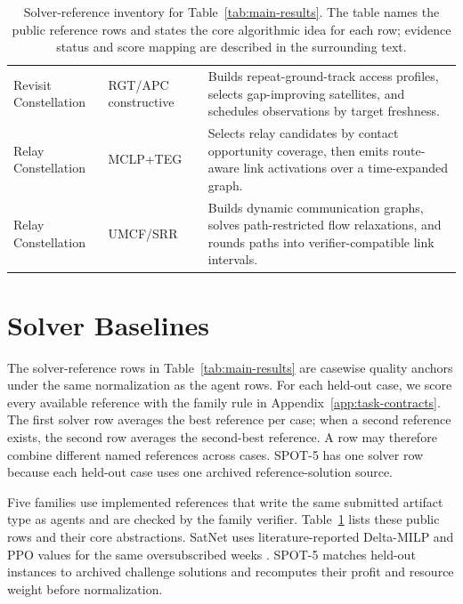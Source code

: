 \documentclass[11pt]{article}
\begin{document}
\begin{table}[!t]
\begin{tabular}{>{\raggedright\arraybackslash}p{}>{\raggedright\arraybackslash}p{}>{\raggedright\arraybackslash}p{}}
Revisit Constellation & RGT/APC constructive \citep{zhang2018leo,lee2020apc,mercado2025scheduling} & Builds repeat-ground-track access profiles, selects gap-improving satellites, and schedules observations by target freshness. \\
Relay Constellation & MCLP+TEG \citep{williams2026optimal,gerard2026contact} & Selects relay candidates by contact opportunity coverage, then emits route-aware link activations over a time-expanded graph. \\
Relay Constellation & UMCF/SRR \citep{grislain2022rethinking,lamothe2023dynamic} & Builds dynamic communication graphs, solves path-restricted flow relaxations, and rounds paths into verifier-compatible link intervals. \\
\hline
\end{tabular}
\caption{Solver-reference inventory for Table~\ref{tab:main-results}. The table names the public reference rows and states the core algorithmic idea for each row; evidence status and score mapping are described in the surrounding text.}
\label{tab:solver-baseline-inventory}
\end{table}

\section{Solver Baselines}
\label{app:solver-baselines}

The solver-reference rows in Table~\ref{tab:main-results} are casewise quality anchors under the same normalization as the agent rows. For each held-out case, we score every available reference with the family rule in Appendix~\ref{app:task-contracts}. The first solver row averages the best reference per case; when a second reference exists, the second row averages the second-best reference. A row may therefore combine different named references across cases. SPOT-5 has one solver row because each held-out case uses one archived reference-solution source.

Five families use implemented references that write the same submitted artifact type as agents and are checked by the family verifier. Table~\ref{tab:solver-baseline-inventory} lists these public rows and their core abstractions. SatNet uses literature-reported Delta-MILP and PPO values for the same oversubscribed weeks \citep{claudet2021delta,goh2022satnet}. SPOT-5 matches held-out instances to archived challenge solutions and recomputes their profit and resource weight before normalization.
\end{document}
